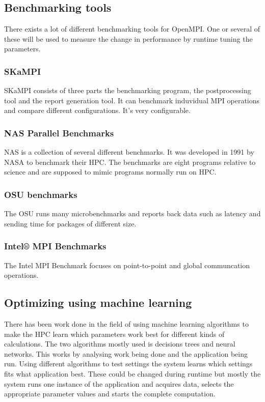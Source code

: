 \documentclass[thesis.tex]{subfiles}
\begin{document}
\subsection{Benchmarking tools}
There exists a lot of different benchmarking tools for OpenMPI. One or several of these will be used to measure the change in performance by runtime tuning the parameters. 
\subsubsection{SKaMPI}
SKaMPI consists of three parts the benchmarking program, the postprocessing tool and the report generation tool. It can benchmark induvidual MPI operations and compare different configurations. It's very configurable. \cite{Reussner98skampi:a}
\subsubsection{NAS Parallel Benchmarks}
NAS is a collection of several different benchmarks. It was developed in 1991 by NASA to benchmark their HPC. The benchmarks are eight programs relative to science and are supposed to mimic programs normally run on HPC.\cite{DBLP:reference/parallel/Bailey11}
\subsubsection{OSU benchmarks}
The OSU runs many microbenchmarks and reports back data such as latency and sending time for packages of different size.
\subsubsection{Intel® MPI Benchmarks}
The Intel MPI Benchmark focuses on point-to-point and global communcation operations.
\subsection{Optimizing using machine learning}
There has been work done in the field of using machine learning algorithms to make the HPC learn which parameters work best for different kinds of calculations. The two algorithms mostly used is decisions trees and neural networks. This works by analysing work being done and the application being run. Using different algorithms to test settings the system learns which settings fits what application best. These could be changed during runtime but mostly the system runs one instance of the application and acquires data, selects the appropriate parameter values and starts the complete computation.\cite{machinelearning}\cite{Pellegrini:2010:ATM:1787275.1787310}
\end{document}
